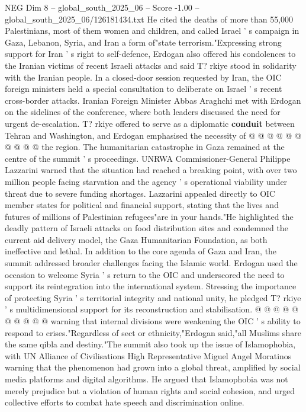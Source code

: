 \begin{textsample}{NEG Dim 8 – global\_south\_2025\_06 – Score -1.00 – global\_south\_2025\_06/126181434.txt}
He cited the deaths of more than 55,000 Palestinians, most of them women and children, and called Israel ' s campaign in Gaza, Lebanon, Syria, and Iran a form of"state terrorism."Expressing strong support for Iran ' s right to self-defence, Erdogan also offered his condolences to the Iranian victims of recent Israeli attacks and said T? rkiye stood in solidarity with the Iranian people.
In a closed-door session requested by Iran, the OIC foreign ministers held a special consultation to deliberate on Israel ' s recent cross-border attacks.
Iranian Foreign Minister Abbas Araghchi met with Erdogan on the sidelines of the conference, where both leaders discussed the need for urgent de-escalation.
T? rkiye offered to serve as a diplomatic \textbf{conduit} between Tehran and Washington, and Erdogan emphasised the necessity of @ @ @ @ @ @ @ @ @ @ the region.
The humanitarian catastrophe in Gaza remained at the centre of the summit ' s proceedings.
UNRWA Commissioner-General Philippe Lazzarini warned that the situation had reached a breaking point, with over two million people facing starvation and the agency ' s operational viability under threat due to severe funding shortages.
Lazzarini appealed directly to OIC member states for political and financial support, stating that the lives and futures of millions of Palestinian refugees"are in your hands."He highlighted the deadly pattern of Israeli attacks on food distribution sites and condemned the current aid delivery model, the Gaza Humanitarian Foundation, as both ineffective and lethal.
In addition to the core agenda of Gaza and Iran, the summit addressed broader challenges facing the Islamic world.
Erdogan used the occasion to welcome Syria ' s return to the OIC and underscored the need to support its reintegration into the international system.
Stressing the importance of protecting Syria ' s territorial integrity and national unity, he pledged T? rkiye ' s multidimensional support for its reconstruction and stabilisation. @ @ @ @ @ @ @ @ @ @ warning that internal divisions were weakening the OIC ' s ability to respond to crises."Regardless of sect or ethnicity,"Erdogan said,"all Muslims share the same qibla and destiny."The summit also took up the issue of Islamophobia, with UN Alliance of Civilisations High Representative Miguel Angel Moratinos warning that the phenomenon had grown into a global threat, amplified by social media platforms and digital algorithms.
He argued that Islamophobia was not merely prejudice but a violation of human rights and social cohesion, and urged collective efforts to combat hate speech and discrimination online.

\end{textsample}
